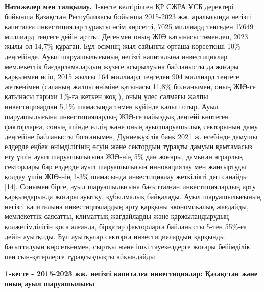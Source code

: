 {{{\bfseries Нәтижелер мен талқылау.} 1-кесте келтірілген ҚР СЖРА ҰСБ
деректері бойынша Қазақстан Республикасы бойынша 2015-2023 жж.
аралығында негізгі капиталға инвестициялар тұрақты өсім көрсетті, 7025
миллиард теңгеден 17649 миллиард теңгеге дейін артты. Дегенмен оның ЖІӨ
қатынасы төмендеп, 2023 жылы ол 14,7\% құраған. Бұл өсімнің жыл сайынғы
орташа көрсеткіші 10\% деңгейінде. Ауыл шаруашылығының негізгі
капиталына инвестициялар мемлекеттік бағдарламалардың жүзеге асырылуына
байланысты да жоғары қарқынмен өсіп, 2015 жылғы 164 миллиард теңгеден
904 миллиард теңгеге жеткенімен (саланың жалпы өніміне қатынасы 11,8\%
болғанымен, оның ЖІӨ-ге қатынасы тарихи 1\%-ға жеткен жоқ ), оның үлес
салмағы жалпы инвестицияардан 5,1\% шамасында төмен күйінде қалып отыр.
Ауыл шаруашылығына инвестициялардың ЖІӨ-ге пайыздық деңгейі көптеген
факторларға, соның ішінде елдің және оның ауылшаруашылық секторының даму
деңгейіне байланысты болғанымен, Дүниежүзілік банк 2021 ж. есебінде
дамушы елдерде еңбек өнімділігінің өсуін және сектордың тұрақты дамуын
қамтамасыз ету үшін ауыл шаруашылығына ЖІӨ-нің 5\% дан жоғары, дамыған
аграрлық секторлары бар елдерде ауыл шаруашылығын инновациялау мен
жаңғыртуды қолдау үшін ЖІӨ-нің 1-3\% шамасында инвестициялау жеткілікті
деп санайды {[}14{]}. Сонымен бірге, ауыл шаруашылығына бағытталған
инвестициялардың арту қарқындарында жоғары ауытқу, құбылмалық байқалады.
Ауыл шаруашылығының негізгі капиталына инвестициялардың арту қарқыны
экономикалық жағдайды, мемлекеттік саясатты, климаттық жағдайларды және
қаржыландырудың қолжетімділігін қоса алғанда, бірқатар факторларға
байланысты 5-тен 55\%-ға дейін ауытқиды. Бұл ауытқулар секторға
инвестициялардың қарқынды бағытталуын көрсеткенмен, сыртқы және ішкі
тәуекелдерге жоғары бейімділік пен сын-қатерлерге тұрақсыздықты
айқындайды.

{\bfseries 1-кесте - 2015-2023 жж. негізгі капиталға инвестициялар:
Қазақстан және оның ауыл шаруашылығы}

}}
